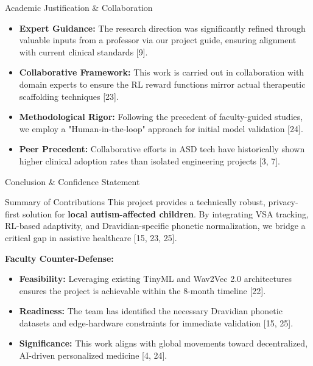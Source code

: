 \documentclass[aspectratio=169, 11pt]{beamer}
\begin{document}
\begin{frame}{Academic Justification & Collaboration}
\small
\begin{itemize}
\item \textbf{Expert Guidance:} The research direction was significantly refined through valuable inputs from a professor via our project guide, ensuring alignment with current clinical standards [9].
\item \textbf{Collaborative Framework:} This work is carried out in collaboration with domain experts to ensure the RL reward functions mirror actual therapeutic scaffolding techniques [23].
\item \textbf{Methodological Rigor:} Following the precedent of faculty-guided studies, we employ a "Human-in-the-loop" approach for initial model validation [24].
\item \textbf{Peer Precedent:} Collaborative efforts in ASD tech have historically shown higher clinical adoption rates than isolated engineering projects [3, 7].
\end{itemize}
\end{frame}

\begin{frame}{Conclusion & Confidence Statement}
\begin{block}{Summary of Contributions}
\small
This project provides a technically robust, privacy-first solution for \textbf{local autism-affected children}. By integrating VSA tracking, RL-based adaptivity, and Dravidian-specific phonetic normalization, we bridge a critical gap in assistive healthcare [15, 23, 25].
\end{block}
\vspace{2mm}
\textbf{Faculty Counter-Defense:}
\begin{itemize}
\item \textbf{Feasibility:} Leveraging existing TinyML and Wav2Vec 2.0 architectures ensures the project is achievable within the 8-month timeline [22].
\item \textbf{Readiness:} The team has identified the necessary Dravidian phonetic datasets and edge-hardware constraints for immediate validation [15, 25].
\item \textbf{Significance:} This work aligns with global movements toward decentralized, AI-driven personalized medicine [4, 24].
\end{itemize}
\end{frame}
\end{document}
